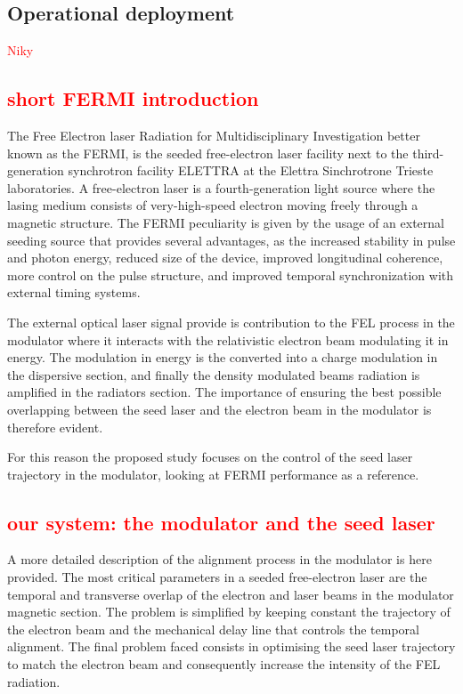 \documentclass[
 reprint,
 amsmath,amssymb,amsfonts,clevref,
 aps,
prstab,
]{revtex4-2}
\newcommand{\NB}[1]{\textcolor{red}{#1}}
\begin{document}
\subsection{Operational deployment}
\NB{Niky} %
\subsection{\NB{short FERMI introduction}}
The Free Electron laser Radiation for Multidisciplinary Investigation  better known as the FERMI, is the seeded free-electron laser facility next to the third-generation synchrotron facility ELETTRA at the Elettra Sinchrotrone Trieste laboratories.
A free-electron laser is a fourth-generation light source where the lasing medium consists of very-high-speed electron moving freely through a magnetic structure. The FERMI peculiarity is given by the usage of an external seeding source that provides several advantages, as the increased stability in pulse and photon energy, reduced size of the device, improved longitudinal coherence, more control on the pulse structure, and improved temporal synchronization with external timing systems.

The external optical laser signal provide is contribution to the FEL process in the modulator where it interacts with the relativistic electron beam modulating it in energy. The modulation in energy is the converted into a charge modulation in the dispersive section, and finally the density modulated beams radiation is amplified in the radiators section. The importance of ensuring the best possible overlapping between the seed laser and the electron beam in the modulator is therefore evident.

For this reason the proposed study focuses on the control of the seed laser trajectory in the modulator, looking at FERMI performance as a reference.

\subsection{\NB{our system: the modulator and the seed laser}}
A more detailed description of the alignment process in the modulator is here provided.
The most critical parameters in a seeded free-electron laser are the temporal and transverse overlap of the electron and laser beams in the modulator magnetic section. 
The problem is simplified by keeping constant the trajectory of the electron beam and the mechanical delay line that controls the temporal alignment.
The final problem faced consists in optimising the seed laser trajectory to match the electron beam and consequently increase the intensity of the FEL radiation.
\end{document}
